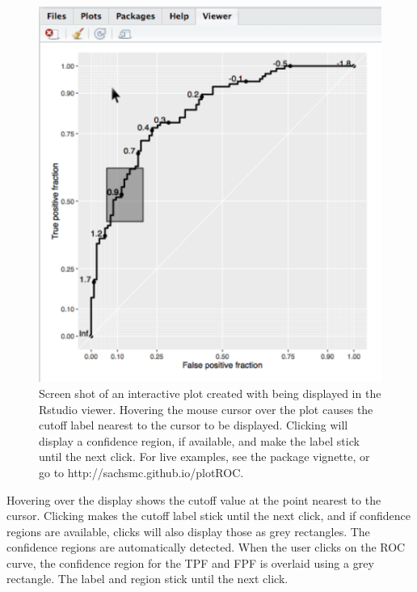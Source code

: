 \documentclass[codesnippet]{jss}
\begin{document}
\begin{figure}[ht]
\centering
\includegraphics{figure/screen-shot.pdf}
\caption{Screen shot of an interactive plot created with  being displayed in the Rstudio viewer. Hovering the mouse cursor over the plot causes the cutoff label nearest to the cursor to be displayed. Clicking will display a confidence region, if available, and make the label stick until the next click. For live examples, see the package vignette, or go to http://sachsmc.github.io/plotROC. \label{interact}}
\end{figure}

Hovering over the display shows the cutoff value at the point nearest to
the cursor. Clicking makes the cutoff label stick until the next click,
and if confidence regions are available, clicks will also display those
as grey rectangles. The confidence regions are automatically detected.
When the user clicks on the ROC curve, the confidence region for the TPF
and FPF is overlaid using a grey rectangle. The label and region stick
until the next click.
\end{document}
